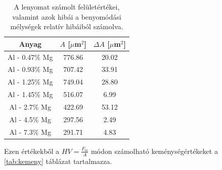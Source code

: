\documentclass[12pt,a4paper]{article}
\begin{document}
\begin{table}[!h]
\begin{center}
\begin{tabular}{|c|c|c|}
\hline
Anyag & $A$ [$\mu$m$^2$] & $\Delta A$ [$\mu$m$^2$]\\
\hline
Al - 0.47$\%$ Mg & 776.86 & 20.02\\ 
\hline
Al - 0.93$\%$ Mg & 707.42  & 33.91\\
\hline
Al - 1.25$\%$ Mg & 749.04 & 28.80\\ 
\hline
Al - 1.45$\%$ Mg & 516.07 & 6.99\\
\hline
Al - 2.7$\%$ Mg & 422.69 & 53.12 \\
\hline
Al - 4.5$\%$ Mg & 297.56 & 2.49\\
\hline
Al - 7.3$\%$ Mg & 291.71 & 4.83\\
\hline
\end{tabular}
\caption{A lenyomat számolt felületértékei, valamint azok hibái a benyomódási mélységek relatív hibáiból számolva.}
\label{tab:fel}
\end{center}
\end{table}
Ezen értékekből a $HV=\frac{F_m}{A}$ módon számolható keménységértékeket a \ref{tab:kemeny} táblázat tartalmazza.
\newpage
\end{document}
